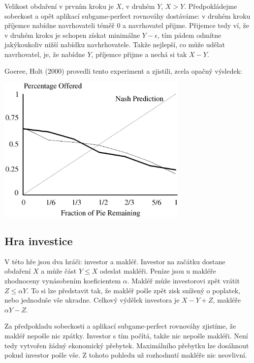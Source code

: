 \documentclass[a5paper,12pt]{article}
\begin{document}
      Velikost obdaření v prvním kroku je $X$, v druhém $Y$, $X>Y$. Předpokládejme sobeckost a opět aplikací
      subgame-perfect rovnováhy dostáváme: v druhém kroku příjemce nabídne navrhovateli téměř 0 a navrhovatel přijme.
      Přijemce tedy ví, že v druhém kroku je schopen získat minimálne $Y-\epsilon$, tím pádem odmítne jakýkoukoliv
      nižší nabídku navhrhovatele. Takže nejlepší, co může udělat navrhovatel, je, že nabídne $Y$, příjemce přijme a
      nechá si tak $X-Y$.

      Goeree, Holt (2000) provedli tento experiment a zjistili, zcela opačný výsledek:\\
      \begin{center}
        \includegraphics[width=0.7\textwidth]{holt.png}
      \end{center}

    \subsection{Hra investice}
      V této hře jsou dva hráči: investor a makléř. Investor na začátku dostane obdaření $X$ a může část $Y\leq X$
      odeslat makléři. Peníze jsou u makléře zhodnoceny vynásobením koeficientem $\alpha$. Makléř může investorovi
      zpět vrátit $Z\leq\alpha Y$. To si lze představit tak, že makléř pošle zpět zisk snížený o poplatek, nebo
      jednoduše vše ukradne. Celkový výdělek investora je $X-Y+Z$, makléře $\alpha Y-Z$.

      Za předpokladu sobeckosti a aplikací subgame-perfect rovnováhy zjistíme, že makléř nepošle nic zpátky. Investor
      s tím počítá, takže nic nepošle makléři. Není tedy vytvořen žádný ekonomický přebytek. Maximálního přebytku lze
      dosáhnout pokud investor pošle vše. Z tohoto pohledu už rozhodnutí makléře nic neovlivní.
\end{document}

